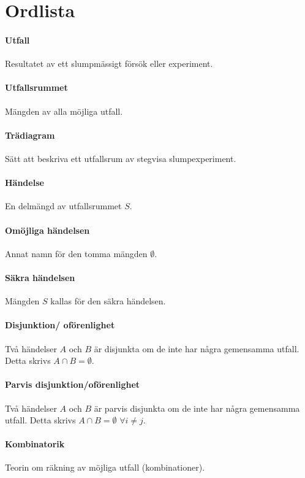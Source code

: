 \chapter{Ordlista}
\subsubsection{Utfall}
Resultatet av ett slumpmässigt försök eller experiment.

\subsubsection{Utfallsrummet}
Mängden av alla möjliga utfall.

\subsubsection{Trädiagram}
Sätt att beskriva ett utfallsrum av stegvisa slumpexperiment.

\subsubsection{Händelse}
En delmängd av utfallsrummet $S$.

\subsubsection{Omöjliga händelsen}
Annat namn för den tomma mängden $\emptyset$.

\subsubsection{Säkra händelsen}
Mängden $S$ kallas för den säkra händelsen.

\subsubsection{Disjunktion/ oförenlighet}
Två händelser $A$ och $B$ är disjunkta om de inte har några gemensamma utfall. Detta skrivs $A \cap B = \emptyset$.

\subsubsection{Parvis disjunktion/oförenlighet}
Två händelser $A$ och $B$ är parvis disjunkta om de inte har några gemensamma utfall. Detta skrivs $A \cap B = \emptyset$ $\forall i\neq j$.

\subsubsection{Kombinatorik}
Teorin om räkning av möjliga utfall (kombinationer).

